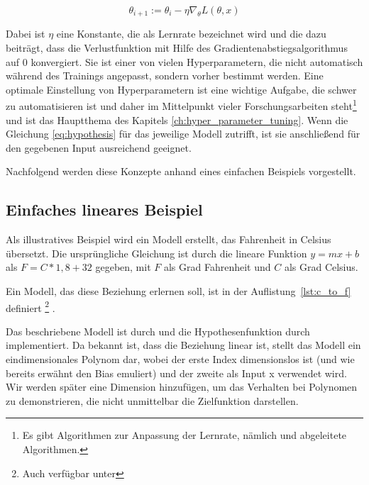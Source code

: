 \begin{equation}
    \theta_{i+1} := \theta_i - \eta \nabla_\theta L(\theta, x)
    \label{eq:gradient_descent}
\end{equation}

Dabei ist $\eta$ eine Konstante, die als Lernrate bezeichnet wird und die dazu beiträgt, dass die Verlustfunktion mit Hilfe des Gradientenabstiegsalgorithmus auf 0 konvergiert.
Sie ist einer von vielen Hyperparametern, die nicht automatisch während des Trainings angepasst, sondern vorher bestimmt werden.
Eine optimale Einstellung von Hyperparametern ist eine wichtige Aufgabe, die schwer zu automatisieren ist und daher im Mittelpunkt vieler Forschungsarbeiten steht\footnote{Es gibt Algorithmen zur Anpassung der Lernrate, nämlich  \cite{Duchi2010} und abgeleitete Algorithmen.} und ist das Hauptthema des Kapitels \ref{ch:hyper_parameter_tuning}.
Wenn die Gleichung \eqref{eq:hypothesis} für das jeweilige Modell zutrifft, ist sie anschließend für den gegebenen Input ausreichend geeignet.

Nachfolgend werden diese Konzepte anhand eines einfachen Beispiels vorgestellt.

\subsection{Einfaches lineares Beispiel} \label{ch:simple_linear_example}

Als illustratives Beispiel wird ein Modell erstellt, das Fahrenheit in Celsius übersetzt.
Die ursprüngliche Gleichung ist durch die lineare Funktion $y = mx + b$ als $F = C * 1,8 + 32$ gegeben, mit $F$ als Grad Fahrenheit und $C$ als Grad Celsius.

Ein Modell, das diese Beziehung erlernen soll, ist in der Auflistung~\ref{lst:c_to_f} definiert \footnote{Auch verfügbar unter } .



Das beschriebene Modell ist durch  und die Hypothesenfunktion durch  implementiert.
Da bekannt ist, dass die Beziehung linear ist, stellt das Modell ein eindimensionales Polynom dar, wobei der erste Index dimensionslos ist (und wie bereits erwähnt den Bias emuliert) und der zweite als Input x verwendet wird.
Wir werden später eine Dimension hinzufügen, um das Verhalten bei Polynomen zu demonstrieren, die nicht unmittelbar die Zielfunktion darstellen.

